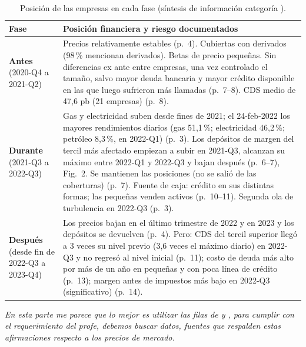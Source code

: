 \documentclass{article} %
\newcommand{\pg}[1]{(p.~#1)}
\begin{document}
        \begin{table}[H]
            \centering\small
                \begin{tabularx}{\textwidth}{>{\raggedright\arraybackslash}p{2.6cm}X}
                    \toprule
                        \textbf{Fase} & \textbf{Posición financiera y riesgo documentados} \\
                    \midrule
                        \textbf{Antes} \newline (2020-Q4 a 2021-Q2) &
                        Precios relativamente estables \pg{4}. Cubiertas con derivados (98\,\% mencionan derivados). Betas de precio pequeñas. Sin diferencias ex ante entre empresas, una vez controlado el tamaño, salvo mayor deuda bancaria y mayor crédito disponible en las que luego sufrieron más llamadas \pg{7--8}. CDS medio de 47,6 pb (21 empresas) \pg{8}. \\
                    \midrule
                        \textbf{Durante} (2021-Q3 a 2022-Q3) &
                        Gas y electricidad suben desde fines de 2021; el 24-feb-2022 los mayores rendimientos diarios (gas 51,1\,\%; electricidad 46,2\,\%; petróleo 8,3\,\%, en 2022-Q1) \pg{3}. Los depósitos de margen del tercil más afectado empiezan a subir en 2021-Q3, alcanzan su máximo entre 2022-Q1 y 2022-Q3 y bajan después \pg{6--7}, Fig.~2. Se mantienen las posiciones (no se salió de las coberturas) \pg{7}. Fuente de caja: crédito en sus distintas formas; las pequeñas venden activos \pg{10--11}. Segunda ola de turbulencia en 2022-Q3 \pg{3}. \\
                    \midrule
                        \textbf{Después} \newline (desde fin de 2022-Q3 a 2023-Q4) &
                        Los precios bajan en el último trimestre de 2022 y en 2023 y los depósitos se devuelven \pg{4}. Pero: CDS del tercil superior llegó a 3 veces su nivel previo (3,6 veces el máximo diario) en 2022-Q3 y no regresó al nivel inicial \pg{11}; costo de deuda más alto por más de un año en pequeñas y con poca línea de crédito \pg{13}; margen antes de impuestos más bajo en 2022-Q3 (significativo) \pg{14}. \\
                    \bottomrule
                \end{tabularx}
            \caption{Posición de las empresas en cada fase (síntesis de información categoría ).}
        \end{table}

        \textit{En esta parte me parece que lo mejor es utilizar las filas de  y , para cumplir con el requerimiento del profe, debemos buscar datos, fuentes que respalden estas afirmaciones respecto a los precios de mercado.}
\end{document}
